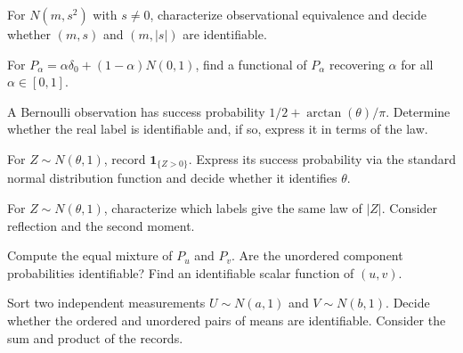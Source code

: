 \documentclass[11pt,oneside]{book}
\theoremstyle{definition}
\theoremstyle{remark}
\begin{document}
\begin{practiceexercise}
\label{wex:signed-normal-scale}
For $N(m,s^2)$ with $s\ne0$, characterize observational equivalence and
decide whether $(m,s)$ and $(m,|s|)$ are identifiable.
\end{practiceexercise}

\begin{practiceexercise}
\label{wex:atom-mixture-weight}
For $P_\alpha=\alpha\delta_0+(1-\alpha)N(0,1)$, find a functional of
$P_\alpha$ recovering $\alpha$ for all $\alpha\in[0,1]$.
\end{practiceexercise}

\begin{practiceexercise}
\label{wex:arctangent-link}
A Bernoulli observation has success probability $1/2+\arctan(\theta)/\pi$.
Determine whether the real label is identifiable and, if so, express it in
terms of the law.
\end{practiceexercise}

\begin{practiceexercise}
\label{wex:threshold-location}
For $Z\sim N(\theta,1)$, record $\mathbf1_{\{Z>0\}}$. Express its success
probability via the standard normal distribution function and decide whether
it identifies $\theta$.
\end{practiceexercise}

\begin{practiceexercise}
\label{wex:folded-normal-sign}
For $Z\sim N(\theta,1)$, characterize which labels give the same law of
$|Z|$. Consider reflection and the second moment.
\end{practiceexercise}

\begin{practiceexercise}
\label{wex:binary-mixture-confounding}
Compute the equal mixture of $P_u$ and $P_v$. Are the unordered component
probabilities identifiable? Find an identifiable scalar function of $(u,v)$.
\end{practiceexercise}

\begin{practiceexercise}
\label{wex:unordered-normal-pair}
Sort two independent measurements $U\sim N(a,1)$ and $V\sim N(b,1)$. Decide whether the ordered and unordered pairs of means are
identifiable. Consider the sum and product of the records.
\end{practiceexercise}
\end{document}
